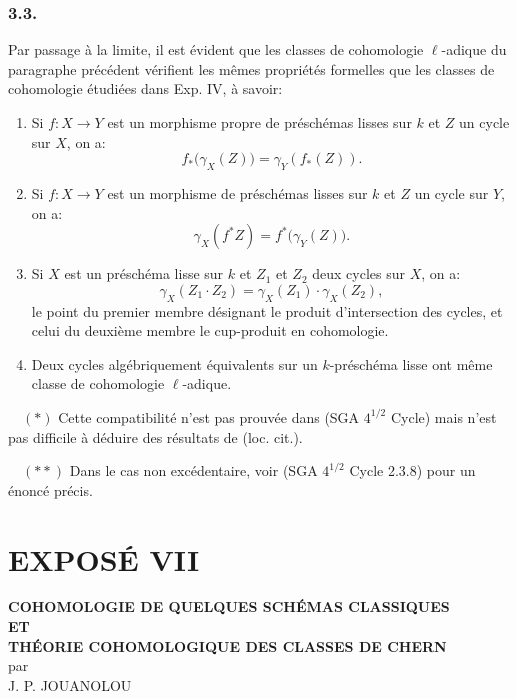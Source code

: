 \subsubsection*{3.3.}
Par passage à la limite, il est évident que les classes de cohomologie \(\ell\)-adique du paragraphe précédent vérifient les mêmes propriétés formelles que les classes de cohomologie étudiées dans Exp. IV, à savoir:

\begin{enumerate}[label=(\roman*)]
\item Si \(f:X\to Y\) est un morphisme propre de préschémas lisses sur \(k\) et \(Z\) un cycle sur \(X\), on a:
\[
f_*\bigl(\gamma_X(Z)\bigr)=\gamma_Y(f_*(Z)).
\tag{*}
\]

\item Si \(f:X\to Y\) est un
morphisme de préschémas lisses sur \(k\) et \(Z\) un cycle sur \(Y\), on a:
\[
\gamma_X(f^*Z)=f^*\bigl(\gamma_Y(Z)\bigr).
\tag{**}
\]

\item Si \(X\) est un préschéma lisse sur \(k\) et \(Z_1\) et \(Z_2\) deux cycles sur \(X\), on a:
\[
\gamma_X(Z_1\cdot Z_2)=\gamma_X(Z_1)\cdot \gamma_X(Z_2),
\tag{**}
\]
le point du premier membre désignant le produit d'intersection des cycles, et celui du deuxième membre le cup-produit en cohomologie.

\item Deux cycles algébriquement équivalents sur un \(k\)-préschéma lisse ont même classe de cohomologie \(\ell\)-adique.
\end{enumerate}

\begin{flushleft}
\(\quad (*)\) Cette compatibilité n'est pas prouvée dans (SGA \(4^{1/2}\) Cycle) mais n'est pas difficile à déduire des résultats de (loc. cit.).

\(\quad (**)\) Dans le cas non excédentaire, voir (SGA \(4^{1/2}\) Cycle 2.3.8) pour un énoncé précis.
\end{flushleft}


\section*{EXPOSÉ VII}

\begin{center}
\textbf{COHOMOLOGIE DE QUELQUES SCHÉMAS CLASSIQUES}\\[0.5em]
\textbf{ET}\\[0.5em]
\textbf{THÉORIE COHOMOLOGIQUE DES CLASSES DE CHERN}\\[1em]
par\\[0.5em]
J. P. JOUANOLOU
\end{center}

